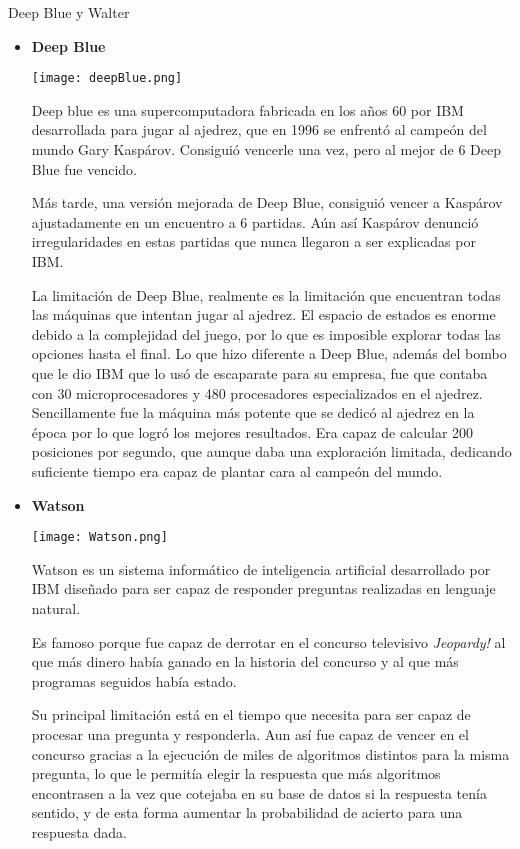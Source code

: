 \documentclass[spanish, a4paper, 12pt]{article} 	%
\begin{document}
\begin{section}{Deep Blue y Walter}
	\begin{itemize}
		\item{\textbf{Deep Blue}}
		
		\begin{center}
		\texttt{[image: deepBlue.png]}
		\end{center}
		
		 Deep blue es una supercomputadora fabricada en los años 60 por IBM desarrollada para jugar al ajedrez, que en 1996 se enfrentó al campeón del mundo Gary Kaspárov. Consiguió vencerle una vez, pero al mejor de 6 Deep Blue fue vencido.
	
		Más tarde, una versión mejorada de Deep Blue, consiguió vencer a Kaspárov ajustadamente en un encuentro a 6 partidas. Aún así Kaspárov denunció irregularidades en estas partidas que nunca llegaron a ser explicadas por IBM. 

		La limitación de Deep Blue, realmente es la limitación que encuentran todas las máquinas que intentan jugar al ajedrez. El espacio de estados es enorme debido a la complejidad del juego, por lo que es imposible explorar todas las opciones hasta el final. Lo que hizo diferente a Deep Blue, además del bombo que le dio IBM que lo usó de escaparate para su empresa, fue que contaba con 30  microprocesadores y 480 procesadores especializados en el ajedrez. Sencillamente fue la máquina más potente que se dedicó al ajedrez en la época por lo que logró los mejores resultados. Era capaz de calcular 200 posiciones por segundo, que aunque daba una exploración limitada, dedicando suficiente tiempo era capaz de plantar cara al campeón del mundo.
	
	\item{\textbf{Watson}}
	
		\begin{center}
		\texttt{[image: Watson.png]}
		\end{center}
	
		Watson es un sistema informático de inteligencia artificial desarrollado por IBM diseñado para ser capaz de responder preguntas realizadas en lenguaje natural.
	
		Es famoso porque fue capaz de derrotar en el concurso televisivo \textit{Jeopardy!} al que más dinero había ganado en la historia del concurso y al que más programas seguidos había estado.
	
		Su principal limitación está en el tiempo que necesita para ser capaz de procesar una pregunta y responderla. Aun así fue capaz de vencer en el concurso gracias a la ejecución de miles de algoritmos distintos para la misma pregunta, lo que le permitía elegir la respuesta que más algoritmos encontrasen a la vez que cotejaba en su base de datos si la respuesta tenía sentido, y de esta forma aumentar la probabilidad de acierto para una respuesta dada. 
		
	\end{itemize}
\end{section}
\end{document}

